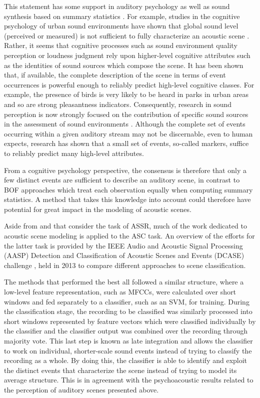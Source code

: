 \documentclass[journal]{IEEEtran}
\begin{document}
This statement has some support in auditory psychology as well as sound synthesis based on summary statistics \cite{mcdermott2013summary}. For example, studies in the cognitive psychology of urban sound environments have shown that global sound level (perceived or measured) is not sufficient to fully characterize an acoustic scene \cite{guyot2005urban,kang2006urban}. Rather, it seems that cognitive processes such as sound environment quality perception \cite{dubois2006cognitive} or loudness judgment \cite{kuwano_memory_2003} rely upon higher-level cognitive attributes such as the identities of sound sources which compose the scene. It has been shown that, if available, the complete description of the scene in terms of event occurrences is powerful enough to reliably predict high-level cognitive classes. For example, the presence of birds is very likely to be heard in parks in urban areas and so are strong pleasantness indicators. Consequently, research in sound perception is now strongly focused on the contribution of specific sound sources in the assessment of sound environments \cite{ricciardi2015sound,lavandier2006contribution}. Although the complete set of events occurring within a given auditory stream may not be discernable, even to human expects, research has shown that a small set of events, so-called markers, suffice to reliably predict many high-level attributes.

From a cognitive psychology perspective, the consensus is therefore that only a few distinct events are sufficient to describe an auditory scene, in contrast to BOF approaches which treat each observation equally when computing summary statistics. A method that takes this knowledge into account could therefore have potential for great impact in the modeling of acoustic scenes.

Aside from \cite{aucouturier2007bag} and \cite{lagrange:hal-01082501} that consider the task of ASSR, much of the work dedicated to acoustic scene modeling is applied to the ASC task.
An overview of the efforts for the latter task is provided by the IEEE Audio and Acoustic Signal Processing (AASP) Detection and Classification of Acoustic Scenes and Events (DCASE) challenge \cite{barchiesi2015acoustic}, held in 2013 to compare different approaches to scene classification.

The methods that performed the best all followed a similar structure, where a low-level feature representation, such as MFCCs, were calculated over short windows and fed separately to a classifier, such as an SVM, for training. During the classification stage, the recording to be classified was similarly processed into short windows represented by feature vectors which were classified individually by the classifier and the classifier output was combined over the recording through majority vote. This last step is known as late integration and allows the classifier to work on individual, shorter-scale sound events instead of trying to classify the recording as a whole. By doing this, the classifier is able to identify and exploit the distinct events that characterize the scene instead of trying to model its average structure. This is in agreement with the psychoacoustic results related to the perception of auditory scenes presented above.
\end{document}
